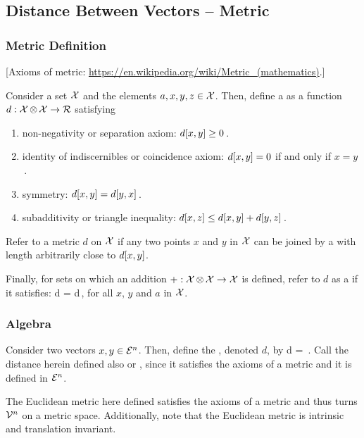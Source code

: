 \subsection{Distance Between Vectors -- Metric}

\subsubsection{Metric Definition}

[Axioms of metric: \url{https://en.wikipedia.org/wiki/Metric_(mathematics)}.]

\begin{definition}
Consider a set $\mathcal{X}$ and the elements $a,x,y,z\in\mathcal{X}$. Then, define a  as a function ${d}:{\mathcal{X}\operatorname{\otimes}\mathcal{X}}\to{\mathcal{R}}$ satisfying
\begin{enumerate}
\item non-negativity or separation axiom: $d\!\left[{x,y}\right]\geq 0$\,.
%
\item identity of indiscernibles or coincidence axiom: $d\!\left[{x,y}\right] = 0$ if and only if $x = y$\,.
%
\item symmetry: $d\!\left[{x,y}\right] = d\!\left[{y,x}\right]$\,.
%
\item subadditivity or triangle inequality: $d\!\left[{x,z}\right]\leq d\!\left[{x,y}\right] + d\!\left[{y,z}\right]$\,.
\end{enumerate}
Refer to a metric $d$ on $\mathcal{X}$  if any two points $x$ and $y$ in $\mathcal{X}$ can be joined by a  with length arbitrarily close to $d\!\left[{x,y}\right]$.

Finally, for sets on which an addition ${+}:{\mathcal{X}\operatorname{\otimes}\mathcal{X}}\to{\mathcal{X}}$ is defined, refer to $d$ as a  if it satisfies:
\beq
d = d\,,
\eeq
for all $x$, $y$ and $a$ in $\mathcal{X}$.
\end{definition}


\subsubsection{Algebra}
Consider two vectors $x,y\in\mathcal{E}^{n}$. Then, define the , denoted $d$, by
\beq
d = \,.
\eeq
Call the distance herein defined also  or , since it satisfies the axioms of a metric and it is defined in $\mathcal{E}^{n}$.

The Euclidean metric here defined satisfies the axioms of a metric and thus turns $\mathcal{V}^{n}$ on a metric space. Additionally, note that the Euclidean metric is intrinsic and translation invariant.

